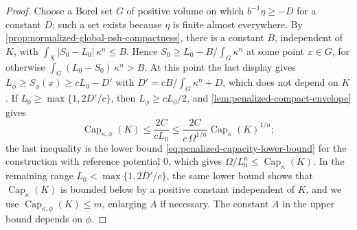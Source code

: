 \begin{proof}
Choose a Borel set $G$ of positive volume on which $b^{-1}\eta\geq-D$ for a constant $D$; such a set exists because $\eta$ is finite almost everywhere. By \cref{prop:normalized-global-psh-compactness}, there is a constant $B$, independent of $K$, with $\int_X|S_0-L_0|\,\kappa^n\leq B$. Hence $S_0\geq L_0-B/\int_G\kappa^n$ at some point $x\in G$, for otherwise $\int_G(L_0-S_0)\,\kappa^n>B$. At this point the last display gives $L_\phi\geq S_\phi(x)\geq cL_0-D'$ with $D'=cB/\int_G\kappa^n+D$, which does not depend on $K$. If $L_0\geq\max\{1,2D'/c\}$, then $L_\phi\geq cL_0/2$, and \cref{lem:penalized-compact-envelope} gives
\[
 \operatorname{Cap}_{\kappa,\phi}(K)\leq\frac{2C}{cL_0}
       \leq\frac{2C}{c\,\Omega^{1/n}}\operatorname{Cap}_\kappa(K)^{1/n};
\]
the last inequality is the lower bound \eqref{eq:penalized-capacity-lower-bound} for the construction with reference potential $0$, which gives $\Omega/L_0^n\leq\operatorname{Cap}_\kappa(K)$. In the remaining range $L_0<\max\{1,2D'/c\}$, the same lower bound shows that $\operatorname{Cap}_\kappa(K)$ is bounded below by a positive constant independent of $K$, and we use $\operatorname{Cap}_{\kappa,\phi}(K)\leq m$, enlarging $A$ if necessary. The constant $A$ in the upper bound depends on $\phi$.
\end{proof}

